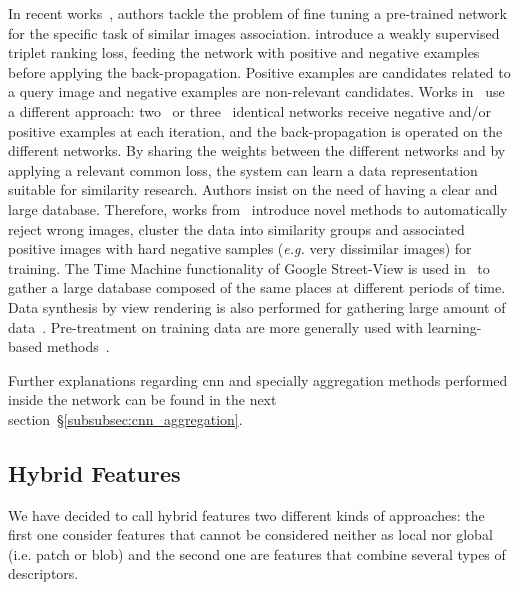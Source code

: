 			In recent works~\citep{Arandjelovic2016,Radenovic2016, Gordo2016}, authors tackle the problem of fine tuning a pre-trained network for the specific task of similar images association. \citet{Arandjelovic2016} introduce a weakly supervised triplet ranking loss, feeding the network with positive and negative examples before applying the back-propagation. Positive examples are candidates related to a query image and negative examples are non-relevant candidates. Works in~\citep{Radenovic2016, Gordo2016} use a different approach: two~\citep{Radenovic2016} or three~\citep{Gordo2016} identical networks receive negative and/or positive examples at each iteration, and the back-propagation is operated on the different networks. By sharing the weights between the different networks and by applying a relevant common loss, the system can learn a data representation suitable for similarity research.	Authors insist on the need of having a clear and large database. Therefore, works from~\citep{Radenovic2016, Gordo2016} introduce novel methods to automatically reject wrong images, cluster the data into similarity groups and associated positive images with hard negative samples (\textit{e.g.} very dissimilar images) for training. The Time Machine functionality of Google Street-View is used in~\citep{Arandjelovic2016} to gather a large database composed of the same places at different periods of time. Data synthesis by view rendering is also performed for gathering large amount of data~\citep{Jia2016,Sizikova2016}.  Pre-treatment on training data are more generally used with learning-based methods~\citep{Kim2015,Cao2013}. 
	
			Further explanations regarding \ac{cnn} and specially aggregation methods performed inside the network can be found in the next section~\S\ref{subsubsec:cnn_aggregation}.

	\subsection{Hybrid Features}
	\label{subsec:hybrid_feature}
		We have decided to call hybrid features two different kinds of approaches: the first one consider features that cannot be considered neither as local nor global (i.e. patch or blob) and the second one are features that combine several types of descriptors.
